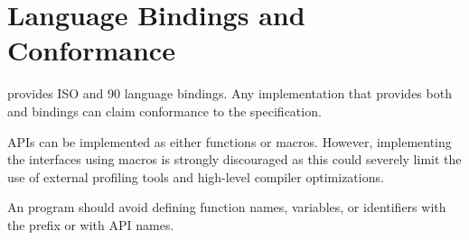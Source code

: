\section{Language Bindings and Conformance}


\openshmem provides ISO \Clang{} and \Fortran{} 90 language
bindings. Any implementation that provides both \Clang{} and \Fortran{} bindings 
can claim conformance to the specification.

\openshmem{} \ac{API}s can be implemented as either 
functions or macros. However, implementing the interfaces using macros is
strongly discouraged as this could severely limit the use of external profiling tools 
and high-level compiler optimizations. 

An \openshmem{} program should avoid defining function names, variables, or
identifiers with the prefix \shmemprefix{} or with \openshmem \ac{API} names.
 
%

